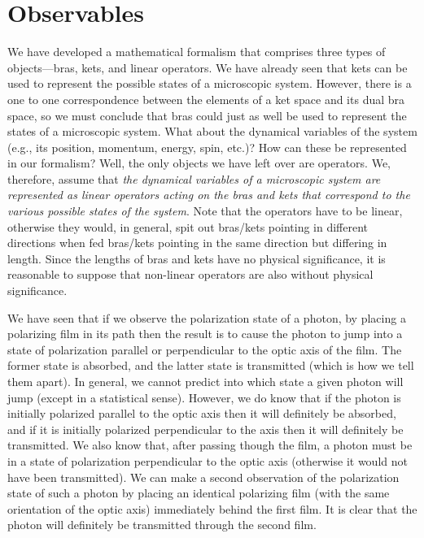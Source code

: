 \section{Observables}
We have developed a mathematical formalism that comprises three types of objects---bras, kets, and linear operators. We have already seen that kets can be used to
represent the possible states of a microscopic system. 
However, there is a one
to one correspondence between the elements of a ket space and its dual bra space,
so we must conclude that bras could just as well be used to represent the states of
a microscopic system. What about the dynamical variables of the  system
({\rm e.g.}, its position, momentum, energy, spin, {\rm etc}.)? How can these be represented in
our formalism? Well, the only objects we have left over are operators.
We, therefore, assume that {\em the dynamical variables of a microscopic system
are represented as linear operators acting on the bras and kets  that correspond 
to
the various possible states of the system}. Note that the operators have to be linear,
otherwise they would, in general, spit out bras/kets pointing in different directions
when fed bras/kets pointing in the same direction but differing in length. Since the
lengths of bras and kets have no physical significance, it is reasonable to suppose
that non-linear operators are also without physical significance. 

We have seen that if we observe the polarization state of a photon, by
placing a polarizing  film in its path then  the result is to cause the photon to
jump into a state of polarization parallel or perpendicular to the optic
axis of the film. The former state is absorbed, and the latter state is
transmitted (which is how we tell them apart). In general, we cannot predict
into which state a given photon will jump (except in a statistical sense). 
However, we do know that if the photon is initially polarized parallel to
the optic axis then it will definitely be absorbed, and if it is
initially  polarized
perpendicular to the axis then it will definitely be transmitted. 
We also know that, after passing though the film, a photon must be 
in a state of polarization perpendicular to the optic axis (otherwise
it would not have been transmitted). We can make a second observation of
the polarization state of such a photon by placing an identical polarizing 
film (with the same orientation of the optic axis) immediately behind the
first film. It is clear that the photon will definitely be transmitted
through the second film. 

